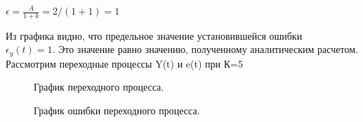 \documentclass[a4paper, 11pt]{article}
\begin{document}
\large{$\epsilon=\frac {A}{1+k} = 2/(1+1) = 1$}


\normalsize{Из графика видно, что предельное значение установившейся ошибки \\ $\epsilon_y(t) = 1$. Это значение равно значению, полученному аналитическим расчетом.
Рассмотрим переходные процессы Y(t) и e(t) при К=5}
\begin{figure}[h]
    \caption{График переходного процесса.}
    \label{four}
\end{figure}
\begin{figure}[h]
    \caption{График ошибки переходного процесса.}
    \label{tree}
\end{figure}
\end{document}
